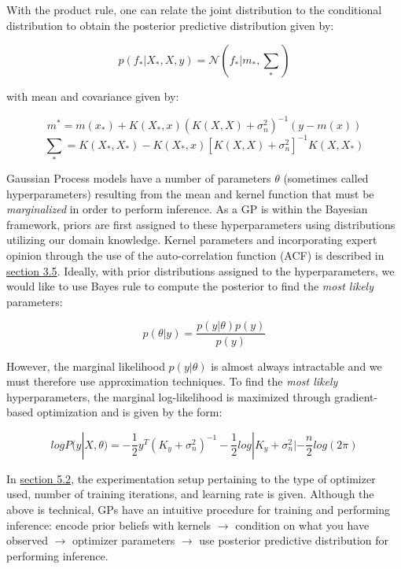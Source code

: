 With the product rule, one can relate the joint distribution to the conditional distribution to obtain the posterior predictive distribution given by:

\begin{equation}
p(f_* | X_*, X, y) = \mathcal{N}(f_* | m_*, \sum_*)
\end{equation}

with mean and covariance given by:

\begin{equation}
m^* = m(x_*) + K(X_*, x)(K(X, X) + \sigma_{n}^2)^{-1}(y - m(x))
\end{equation}
\begin{equation}
\sum_{*} = K(X_*, X_*) - K(X_*, x)[K(X, X) + \sigma_{n}^2]^{-1}K(X, X_*)
\end{equation}

Gaussian Process models have a number of parameters $\theta$ (sometimes called hyperparameters) resulting from the mean and kernel function that must be \textit{marginalized} in order to perform inference. As a GP is within the Bayesian framework, priors are first assigned to these hyperparameters using distributions utilizing our domain knowledge. Kernel parameters and incorporating expert opinion through the use of the auto-correlation function (ACF) is described in \hyperlink{subsection.3.5}{section 3.5}. Ideally, with prior distributions assigned to the hyperparameters, we would like to use Bayes rule to compute the posterior to find the \textit{most likely} parameters:

\begin{equation}
p(\theta | y) = \frac{p(y | \theta)p(y)}{p(y)}
\end{equation}

However, the marginal likelihood $p(y | \theta)$ is almost always intractable and we must therefore use approximation techniques. To find the \textit{most likely} hyperparameters, the marginal log-likelihood is maximized through gradient-based optimization and is given by the form:

\begin{equation}
log P(y | X, \theta) = -\frac{1}{2}y^T(K_{y} + \sigma_{n}^2)^{-1} - \frac{1}{2}log|K_{y} + \sigma_{n}^2| - \frac{n}{2} log(2\pi)
\end{equation}

In \hyperlink{subsection.5.2}{section 5.2}, the experimentation setup pertaining to the type of optimizer used, number of training iterations, and learning rate is given. Although the above is technical, GPs have an intuitive procedure for training and performing inference: encode prior beliefs with kernels $\rightarrow$ condition on what you have observed $\rightarrow$ optimizer parameters $\rightarrow$ use posterior predictive distribution for performing inference.

